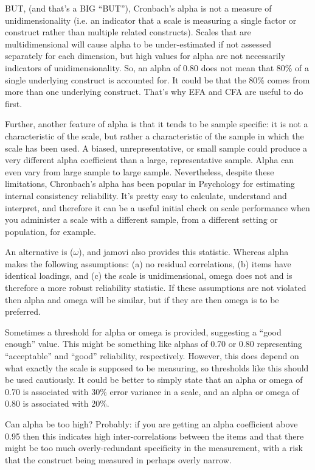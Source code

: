 BUT, (and that’s a BIG “BUT”), Cronbach’s alpha is not a measure of unidimensionality (i.e. an indicator that a scale is measuring a single factor or construct rather than multiple related constructs). Scales that are multidimensional will cause alpha to be under-estimated if not assessed separately for each dimension, but high values for alpha are not necessarily indicators of unidimensionality. So, an alpha of 0.80 does not mean that 80\% of a single underlying construct is accounted for. It could be that the 80\% comes from more than one underlying construct. That’s why EFA and CFA are useful to do first.

Further, another feature of alpha is that it tends to be sample specific: it is not a characteristic of the scale, but rather a characteristic of the sample in which the scale has been used. A biased, unrepresentative, or small sample could produce a very different alpha coefficient than a large, representative sample. Alpha can even vary from large sample to large sample. Nevertheless, despite these limitations, Chronbach’s alpha has been popular in Psychology for estimating internal consistency reliability. It’s pretty easy to calculate, understand and interpret, and therefore it can be a useful initial check on scale performance when you administer a scale with a different sample, from a different setting or population, for example. 

An alternative is  ($\omega$), and jamovi also provides this statistic. Whereas alpha makes the following assumptions: (a) no residual correlations, (b) items have identical loadings, and (c) the scale is unidimensional, omega does not and is therefore a more robust reliability statistic. If these assumptions are not violated then alpha and omega will be similar, but if they are then omega is to be preferred. 

Sometimes a threshold for alpha or omega is provided, suggesting a “good enough” value. This might be something like alphas of 0.70 or 0.80 representing “acceptable” and “good” reliability, respectively. However, this does depend on what exactly the scale is supposed to be measuring, so thresholds like this should be used cautiously. It could be better to simply state that an alpha or omega of 0.70 is associated with 30\% error variance in a scale, and an alpha or omega of 0.80 is associated with 20\%.

Can alpha be too high? Probably: if you are getting an alpha coefficient above 0.95 then this indicates high inter-correlations between the items and that there might be too much overly-redundant specificity in the measurement, with a risk that the construct being measured in perhaps overly narrow. 

